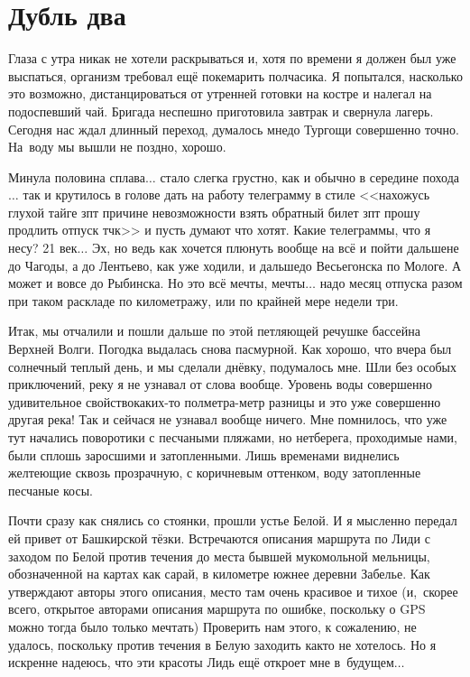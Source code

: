 \chapter{Дубль два} 

Глаза с утра никак не хотели раскрываться и, хотя по времени я должен был уже выспаться, организм требовал ещё покемарить полчасика. Я попытался, насколько это возможно, дистанцироваться от утренней готовки на костре и налегал на подоспевший чай. Бригада неспешно приготовила завтрак и свернула лагерь. Сегодня нас ждал длинный переход, думалось мне\mdash до Тургощи совершенно точно. На~воду мы вышли не поздно, хорошо.  

Минула половина сплава$\ldots$ стало слегка грустно, как и обычно в середине похода$\ldots$ так и крутилось в голове дать на работу телеграмму в стиле <<нахожусь глухой тайге зпт причине невозможности взять обратный билет зпт прошу продлить отпуск тчк>> и пусть думают что хотят. Какие телеграммы, что я несу? 21 век$\ldots$ Эх, но ведь как хочется плюнуть вообще на всё и пойти дальше\mdash не до Чагоды, а до Лентьево, как уже ходили, и дальше\mdash до Весьегонска по Мологе. А может и вовсе до Рыбинска. Но это всё мечты, мечты$\ldots$ надо месяц отпуска разом при таком раскладе по километражу, или по крайней мере недели три.

Итак, мы отчалили и пошли дальше по этой петляющей речушке бассейна Верхней Волги. Погодка выдалась снова пасмурной. Как хорошо, что вчера был солнечный теплый день, и мы сделали днёвку, подумалось мне. Шли без особых приключений, реку я не узнавал от слова вообще. Уровень воды совершенно удивительное свойство\mdash каких-то полметра-метр разницы и это уже совершенно другая река! Так и сейчас\mdash я не узнавал вообще ничего. Мне помнилось, что уже тут начались поворотики с песчаными пляжами, но нет\mdash берега, проходимые нами, были сплошь заросшими и затопленными. Лишь временами виднелись желтеющие сквозь прозрачную, с коричневым оттенком, воду затопленные песчаные косы.

Почти сразу как снялись со стоянки, прошли устье Белой. И я мысленно передал ей привет от Башкирской тёзки. Встречаются описания маршрута по Лиди с заходом по Белой против течения до места бывшей мукомольной мельницы, обозначенной на картах как сарай, в километре южнее деревни Забелье. Как утверждают авторы этого описания, место там очень красивое и тихое (и,~скорее всего, открытое авторами описания маршрута по ошибке, поскольку о GPS можно тогда было только мечтать) Проверить нам этого, к сожалению, не удалось, поскольку против течения в Белую заходить как\sdash то не хотелось. Но я искренне надеюсь, что эти красоты Лидь ещё откроет мне в~будущем$\ldots$

